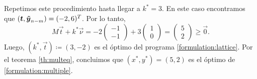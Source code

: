 \begin{example}
	Repetimos este procedimiento hasta llegar a $k^* = 3$. En este caso encontramos que $(\boldsymbol{t},
	\boldsymbol{\tilde{y}}_{n-m}) = (-2, 6)^T$. Por lo tanto,
	\begin{equation*}
		M\vec{t} + k^*\vec{\nu}
		= -2 \begin{pmatrix} -1 \\ -1 \end{pmatrix} + 3 \begin{pmatrix} 1 \\ 0 \end{pmatrix}
		= \begin{pmatrix} 5 \\ 2 \end{pmatrix} \geq \vec{0}.
	\end{equation*}
	Luego, $(k^*, \vec{t}) \coloneq (3, -2)$ es el óptimo del programa
	\eqref{formulation:lattice}. Por el teorema \ref{th:multeq}, concluimos que $(x^*, y^*) = (5,
	2)$ es el óptimo de \eqref{formulation:multiple}.
\end{example}
\newpage

